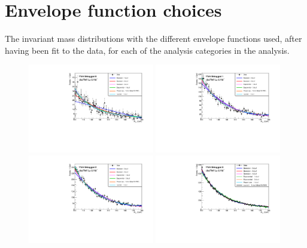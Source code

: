 \chapter{Envelope function choices}
\label{sec:app_env}

The invariant mass distributions with the different envelope functions used, after having been fit to the data, for each of the analysis categories in the \MFM analysis.

\begin{figure}
  \includegraphics[width=0.49\textwidth]{analysis/plots/multipdf_plots/cat0_7TeV.pdf}
  \includegraphics[width=0.49\textwidth]{analysis/plots/multipdf_plots/cat1_7TeV.pdf}\\
  \includegraphics[width=0.49\textwidth]{analysis/plots/multipdf_plots/cat2_7TeV.pdf}
  \includegraphics[width=0.49\textwidth]{analysis/plots/multipdf_plots/cat3_7TeV.pdf}\\

\end{figure}
